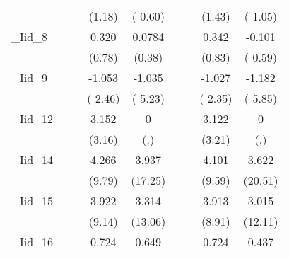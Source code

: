 {\begin{tabular}{l*{8}{c}}
            &                     &                     &      (1.18)         &     (-0.60)         &                     &                     &      (1.43)         &     (-1.05)         \\
[1em]
\_Iid\_8      &                     &                     &       0.320         &      0.0784         &                     &                     &       0.342         &      -0.101         \\
            &                     &                     &      (0.78)         &      (0.38)         &                     &                     &      (0.83)         &     (-0.59)         \\
[1em]
\_Iid\_9      &                     &                     &      -1.053\sym{*}  &      -1.035\sym{***}&                     &                     &      -1.027\sym{*}  &      -1.182\sym{***}\\
            &                     &                     &     (-2.46)         &     (-5.23)         &                     &                     &     (-2.35)         &     (-5.85)         \\
[1em]
\_Iid\_12     &                     &                     &       3.152\sym{**} &           0         &                     &                     &       3.122\sym{**} &           0         \\
            &                     &                     &      (3.16)         &         (.)         &                     &                     &      (3.21)         &         (.)         \\
[1em]
\_Iid\_14     &                     &                     &       4.266\sym{***}&       3.937\sym{***}&                     &                     &       4.101\sym{***}&       3.622\sym{***}\\
            &                     &                     &      (9.79)         &     (17.25)         &                     &                     &      (9.59)         &     (20.51)         \\
[1em]
\_Iid\_15     &                     &                     &       3.922\sym{***}&       3.314\sym{***}&                     &                     &       3.913\sym{***}&       3.015\sym{***}\\
            &                     &                     &      (9.14)         &     (13.06)         &                     &                     &      (8.91)         &     (12.11)         \\
[1em]
\_Iid\_16     &                     &                     &       0.724         &       0.649\sym{***}&                     &                     &       0.724         &       0.437\sym{**} \\

\end{tabular}}
